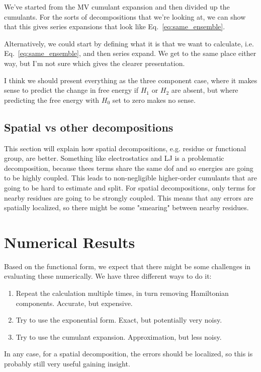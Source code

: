 \documentclass{article}
\begin{document}
We've started from the MV cumulant expansion and then divided up the cumulants. For the sorts of decompositions that we're looking at, we can show that this gives series expansions that look like Eq.~\ref{eq:same_ensemble}.

Alternatively, we could start by defining what it is that we want to calculate, i.e. Eq.~\ref{eq:same_ensemble}, and then series expand. We get to the same place either way, but I'm not sure which gives the clearer presentation.

I think we should present everything as the three component case, where it makes sense to predict the change in free energy if $H_1$ or $H_2$ are absent, but where predicting the free energy with $H_0$ set to zero makes no sense.

\subsection{Spatial vs other decompositions}

This section will explain how spatial decompositions, e.g. residue or functional group, are better. Something like electrostatics and LJ is a problematic decomposition, because thees terms share the same dof and so energies are going to be highly coupled. This leads to non-negligible higher-order cumulants that are going to be hard to estimate and split. For spatial decompositions, only terms for nearby residues are going to be strongly coupled. This means that any errors are spatially localized, so there might be some "smearing" between nearby residues.

\section{Numerical Results}

Based on the functional form, we expect that there might be some challenges in evaluating these numerically. We have three different ways to do it:
\begin{enumerate}
	\item Repeat the calculation multiple times, in turn removing Hamiltonian components. Accurate, but expensive.
	\item Try to use the exponential form. Exact, but potentially very noisy.
	\item Try to use the cumulant expansion. Approximation, but less noisy.
\end{enumerate}

In any case, for a spatial decomposition, the errors should be localized, so this is probably still very useful gaining insight.
\end{document}
